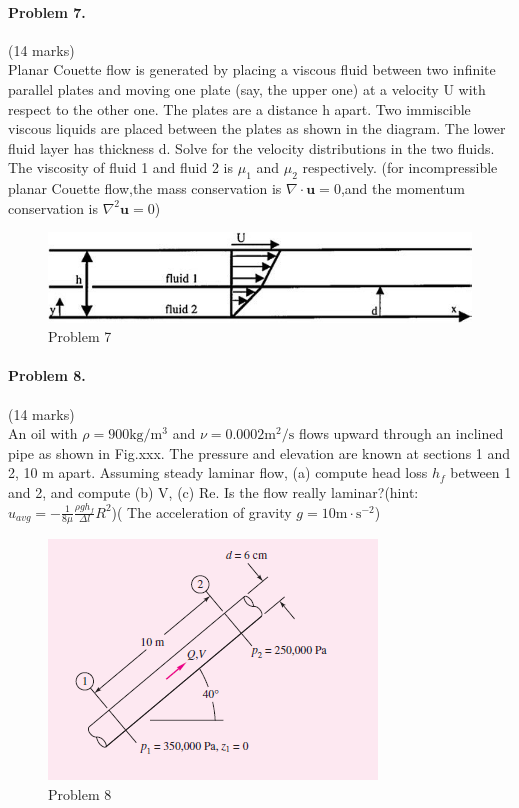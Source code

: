 \documentclass[12pt]{article}
\begin{document}
\newpage
\paragraph{Problem 7.}\hfill (14 marks)\\
Planar Couette flow is generated by placing a viscous fluid between two infinite parallel plates and moving one plate (say, the upper one) at a velocity U with respect to the other one. The plates are a distance h apart. Two immiscible viscous liquids are placed between the plates as shown in the diagram. The lower fluid layer has thickness d. Solve for the velocity distributions in the two fluids.
The viscosity of fluid 1 and fluid 2 is $\mu_1$ and $\mu_2$ respectively.
(for incompressible planar Couette flow,the mass conservation is $\nabla \cdot \textbf{u}=0$,and the momentum conservation is $\nabla^2 \textbf{u}=0$)

\begin{figure}[h]
	\centering
	\includegraphics[width=0.7\linewidth]{"figs/problem 7"}
	\caption{Problem 7}
	\label{fig:problem-7}
\end{figure}


\bigskip
\paragraph{Problem 8.}\hfill (14 marks)\\
An oil with $\rho=\mathrm{900 kg/m^3}$ and $\nu=\mathrm{0.0002 m^2/s}$ flows upward through an inclined pipe as shown in Fig.xxx. The pressure and elevation are known at sections 1 and 2, 10 m apart. Assuming steady laminar flow, (a) compute head loss $h_f$ between 1 and 2, and compute (b) V, (c) Re. Is the flow really laminar?(hint:$u_{avg}=-\frac{1}{8\mu}\frac{\rho g h_f}{\Delta l}R^2$)( The acceleration of gravity $g=\mathrm{10m\cdot s^{-2}}$)

\begin{figure}[h]
	\centering
	\includegraphics[width=0.5\linewidth]{"figs/problem 8"}
	\caption{Problem 8}
	\label{fig:problem-8}
\end{figure}

\end{document}
